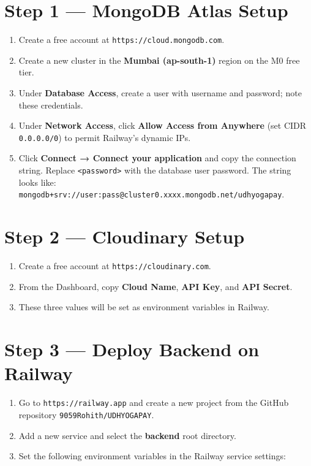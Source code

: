 \documentclass[12pt,a4paper]{report}
\begin{document}
\section{Step 1 — MongoDB Atlas Setup}

\begin{enumerate}[leftmargin=*]
\item Create a free account at \texttt{https://cloud.mongodb.com}.
\item Create a new cluster in the \textbf{Mumbai (ap-south-1)} region on the M0 free tier.
\item Under \textbf{Database Access}, create a user with username and password; note these credentials.
\item Under \textbf{Network Access}, click \textbf{Allow Access from Anywhere} (set CIDR \texttt{0.0.0.0/0}) to permit Railway's dynamic IPs.
\item Click \textbf{Connect → Connect your application} and copy the connection string. Replace \texttt{<password>} with the database user password. The string looks like: \texttt{mongodb+srv://user:pass@cluster0.xxxx.mongodb.net/udhyogapay}.
\end{enumerate}

\section{Step 2 — Cloudinary Setup}

\begin{enumerate}[leftmargin=*]
\item Create a free account at \texttt{https://cloudinary.com}.
\item From the Dashboard, copy \textbf{Cloud Name}, \textbf{API Key}, and \textbf{API Secret}.
\item These three values will be set as environment variables in Railway.
\end{enumerate}

\section{Step 3 — Deploy Backend on Railway}

\begin{enumerate}[leftmargin=*]
\item Go to \texttt{https://railway.app} and create a new project from the GitHub repository \texttt{9059Rohith/UDHYOGAPAY}.
\item Add a new service and select the \textbf{backend} root directory.
\item Set the following environment variables in the Railway service settings:
\end{enumerate}
\end{document}
